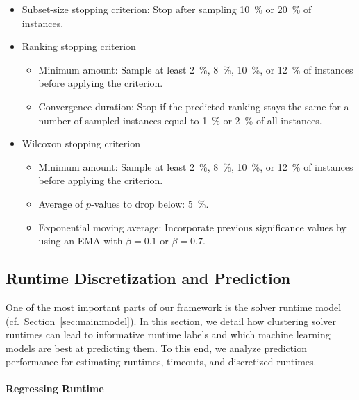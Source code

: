 \documentclass[sn-basic, Numbered]{sn-jnl} %
\begin{document}
\begin{itemize}\setlength{\itemsep}{1pt}
  \item Subset-size stopping criterion: Stop after sampling \SI{10}{\%} or \SI{20}{\%} of instances.
  \item Ranking stopping criterion
  \vspace*{-1ex}
  \begin{itemize}\setlength{\itemsep}{1pt}
    \item Minimum amount: Sample at least \SI{2}{\%}, \SI{8}{\%}, \SI{10}{\%}, or \SI{12}{\%} of instances before applying the criterion.
    \item Convergence duration: Stop if the predicted ranking stays the same for a number of sampled instances equal to \SI{1}{\%} or \SI{2}{\%} of all instances.
  \end{itemize}
  \item Wilcoxon stopping criterion
  \vspace*{-1ex}
  \begin{itemize}\setlength{\itemsep}{1pt}
    \item Minimum amount: Sample at least \SI{2}{\%}, \SI{8}{\%}, \SI{10}{\%}, or \SI{12}{\%} of instances before applying the criterion.
    \item Average of $p$-values to drop below: \SI{5}{\%}.
    \item Exponential moving average: Incorporate previous significance values by using an EMA with $\beta = 0.1$ or $\beta = 0.7$.
  \end{itemize}
\end{itemize}

\subsection{Runtime Discretization and Prediction}
\label{sec:exdesign:disc-pred}

One of the most important parts of our framework is the solver runtime model (cf.~Section~\ref{sec:main:model}).
In this section, we detail how clustering solver runtimes can lead to informative runtime labels and which machine learning models are best at predicting them.
To this end, we analyze prediction performance for estimating runtimes, timeouts, and discretized runtimes.

\paragraph{Regressing Runtime}
\end{document}

